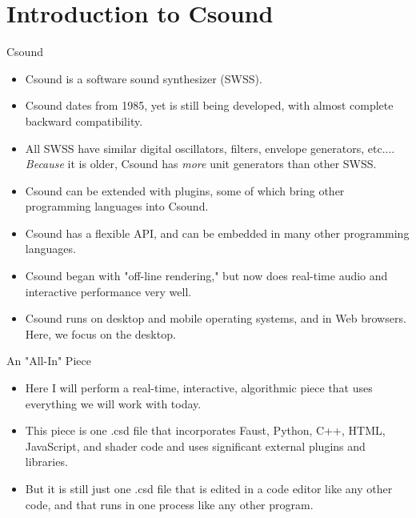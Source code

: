 \documentclass{beamer}
\begin{document}
    \section{Introduction to Csound}
    \begin{frame}{Csound}
        \begin{itemize}
            \item Csound is a software sound synthesizer (SWSS).
            \item Csound dates from 1985, yet is still being developed, with almost
            complete backward compatibility.
            \item All SWSS have similar digital oscillators, filters, envelope generators, etc....
            \textit{Because} it is older, Csound has \textit{more} unit generators
            than other SWSS.
            \item Csound can be extended with plugins, some of which bring other
            programming languages into Csound. 
            \item Csound has a flexible API, and can be embedded in many other
            programming languages.
            \item Csound began with "off-line rendering," but now does real-time
            audio and interactive performance very well.
            \item Csound runs on desktop and mobile operating systems, and in Web
            browsers. Here, we focus on the desktop. 
        \end{itemize}
    \end{frame}
    \begin{frame}{An "All-In" Piece}
        \begin{itemize}
            \item Here I will perform a real-time, interactive, algorithmic piece
            that uses everything we will work with today.
            \item This piece is one .csd file that incorporates Faust, Python, C++,
            HTML, JavaScript, and shader code and uses significant external plugins and
            libraries.
            \item But it is still just one .csd file that is edited in a code editor
            like any other code, and that runs in one process like any other program.
        \end{itemize}
    \end{frame}
    
\end{document}
